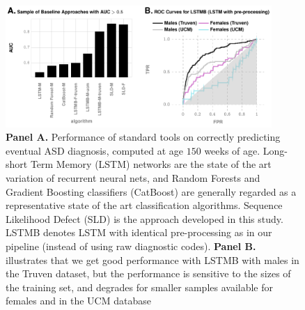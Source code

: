 \documentclass[onecolumn,,10pt]{IEEEtran}
\renewcommand{\captionN}[1]{\caption{\color{black} \sffamily \fontsize{9}{10}\selectfont #1  }}
\newif\iftikzX
\newif\ifFIGS
\begin{document}
\begin{figure}[t]
  \tikzexternalenable 
    \def\TEXTCOL{gray}
    \def\MXCOL{black}
    \centering

   \iftikzX

\else
  \includegraphics[width=0.9\textwidth]{Figures/External/stdtools}
  \fi 
  \captionN{\textbf{Panel A.} Performance of standard tools on correctly predicting eventual ASD diagnosis, computed at age $150$ weeks of age. Long-short Term Memory (LSTM) networks are the state of the art variation of recurrent neural nets, and Random Forests and Gradient Boosting classifiers (CatBoost) are generally regarded as a representative state of the art classification algorithms. Sequence Likelihood Defect (SLD) is the approach developed in this study. LSTMB denotes LSTM with identical pre-processing as in our pipeline (instead of using raw diagnostic codes). \textbf{Panel B.} illustrates that we get good performance with LSTMB with males in the Truven dataset, but the performance is sensitive to the sizes of the training set, and degrades for smaller samples available for females and in the UCM database}\label{EXT-figcompwsoa}
\end{figure}
\else
{}\label{EXT-figcompwsoa}
\fi
\ifFIGS
\end{document}
